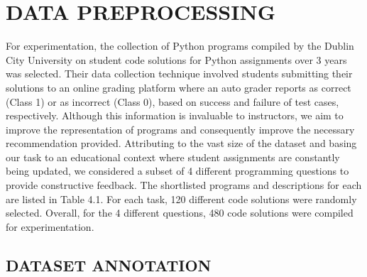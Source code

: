 
\chapter{DATA PREPROCESSING} %

For experimentation, the collection of Python programs compiled by the
Dublin City University \cite{A} on student code solutions for Python
assignments over 3 years was selected. Their data collection technique
involved students submitting their solutions to an online grading
platform where an auto grader reports as correct (Class 1) or as
incorrect (Class 0), based on success and failure of test cases,
respectively. Although this information is invaluable to instructors,
we aim to improve the representation of programs and consequently
improve the necessary recommendation provided. Attributing to the vast
size of the dataset and basing our task to an educational context
where student assignments are constantly being updated, we considered
a subset of 4 different programming questions to provide constructive
feedback. The shortlisted programs and descriptions for each are
listed in Table 4.1. For each task, 120 different code solutions were
randomly selected.  Overall, for the 4 different questions, 480 code
solutions were compiled for experimentation.

\begin{table}[H]
\caption{Questions and Description}
\centering
{}

\label{tab:ques}
\end{table}

\section{DATASET ANNOTATION}

